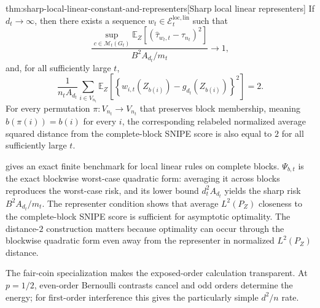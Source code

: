 \documentclass[11pt]{article}
\begin{document}
\begin{theoremv}{thm:sharp-local-linear-constant-and-representers}[Sharp local linear representers]
If \(d_t\to\infty\), then there exists a sequence \(w_t\in\mathcal E_t^{\mathrm{loc,lin}}\) such that
\[
\frac{
\sup_{c\in\mathcal M_t(G_t)}
\mathbb E_Z\!\left[(\widehat\tau_{w_t,t}-\tau_{n_t})^2\right]
}{
B^2A_{d_t}/m_t
}
\longrightarrow 1,
\]
and, for all sufficiently large \(t\),
\[
\frac{1}{n_tA_{d_t}}
\sum_{i\in V_{n_t}}
\mathbb E_Z\!\left[
\left\{
w_{i,t}(Z_{b(i)})-g_{d_t}(Z_{b(i)})
\right\}^2
\right]
=2.
\]
For every permutation \(\pi:V_{n_t}\to V_{n_t}\) that preserves block membership, meaning \(b(\pi(i))=b(i)\) for every \(i\), the corresponding relabeled normalized average squared distance from the complete-block SNIPE score is also equal to \(2\) for all sufficiently large \(t\).
\end{theoremv}

 gives an exact finite benchmark for local linear rules on complete blocks. \(\Psi_{b,t}\) is the exact blockwise worst-case quadratic form: averaging it across blocks reproduces the worst-case risk, and its lower bound \(d_t^2A_{d_t}\) yields the sharp risk \(B^2A_{d_t}/m_t\). The representer condition shows that average \(L^2(P_Z)\) closeness to the complete-block SNIPE score is sufficient for asymptotic optimality. The distance-\(2\) construction matters because optimality can occur through the blockwise quadratic form even away from the representer in normalized \(L^2(P_Z)\) distance.

The fair-coin specialization makes the exposed-order calculation transparent. At \(p=1/2\), even-order Bernoulli contrasts cancel and odd orders determine the energy; for first-order interference this gives the particularly simple \(d^2/n\) rate.
\end{document}
